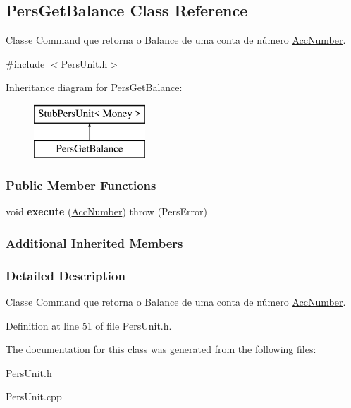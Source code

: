 \hypertarget{classPersGetBalance}{\subsection{Pers\-Get\-Balance Class Reference}
\label{d3/d71/classPersGetBalance}
}


Classe Command que retorna o Balance de uma conta de número \hyperlink{classAccNumber}{Acc\-Number}.  




{\ttfamily \#include $<$Pers\-Unit.\-h$>$}

Inheritance diagram for Pers\-Get\-Balance\-:\begin{figure}[H]
\begin{center}
\leavevmode
\includegraphics[height=2.000000cm]{d3/d71/classPersGetBalance}
\end{center}
\end{figure}
\subsubsection*{Public Member Functions}
\begin{DoxyCompactItemize}
\item 
\hypertarget{classPersGetBalance_a265f69b7d01b99c252f421eec95dcedb}{void {\bfseries execute} (\hyperlink{classAccNumber}{Acc\-Number})  throw (\-Pers\-Error)}\label{d3/d71/classPersGetBalance_a265f69b7d01b99c252f421eec95dcedb}

\end{DoxyCompactItemize}
\subsubsection*{Additional Inherited Members}


\subsubsection{Detailed Description}
Classe Command que retorna o Balance de uma conta de número \hyperlink{classAccNumber}{Acc\-Number}. 

Definition at line 51 of file Pers\-Unit.\-h.



The documentation for this class was generated from the following files\-:\begin{DoxyCompactItemize}
\item 
Pers\-Unit.\-h\item 
Pers\-Unit.\-cpp\end{DoxyCompactItemize}
